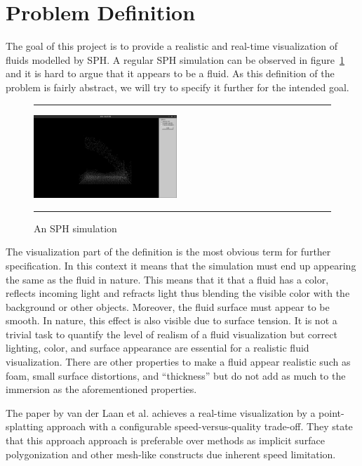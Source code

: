 \section{Problem Definition}
The goal of this project is to provide a realistic and real-time visualization of fluids modelled by SPH.
A regular SPH simulation can be observed in figure~\ref{fig:sph} and it is hard to argue that it appears to be a fluid.
As this definition of the problem is fairly abstract, we will try to specify it further for the intended goal.

\begin{figure}[!th]
\hrule
\begin{center}
\vspace*{2ex}\includegraphics[width=0.48\textwidth,clip=true,trim=10cm 3cm 10cm 3cm]{pictures/sph.png}
\end{center}
\caption{An SPH simulation}
\label{fig:sph} 
\vspace*{2ex}
\hrule
\end{figure}
The visualization part of the definition is the most obvious term for further specification. 
In this context it means that the simulation must end up appearing the same as the fluid in nature.
This means that it that a fluid has a color, reflects incoming light and refracts light thus blending the visible color with the background or other objects.
Moreover, the fluid surface must appear to be smooth. In nature, this effect is also visible due to surface tension.
It is not a trivial task to quantify the level of realism of a fluid visualization but correct lighting, color, and surface appearance are essential for a realistic fluid visualization.
There are other properties to make a fluid appear realistic such as foam, small surface distortions, and ``thickness'' but do not add as much to the immersion as the aforementioned properties.

The paper by van der Laan et al. \cite{van2009screen} achieves a real-time visualization by a point-splatting approach with a configurable speed-versus-quality trade-off.
They state that this approach approach is preferable over methods as implicit surface polygonization and other mesh-like constructs due inherent speed limitation.


